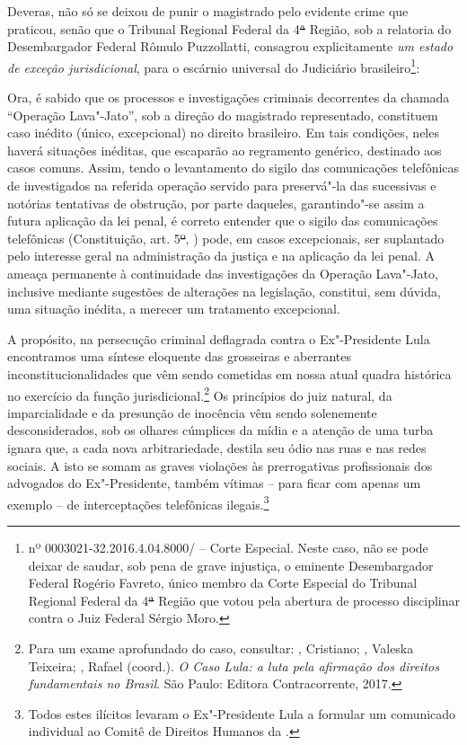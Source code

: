 Deveras, não só se deixou de punir o magistrado pelo evidente crime que
praticou, senão que o Tribunal Regional Federal da 4\sout{ª} Região, sob
a relatoria do Desembargador Federal Rômulo Puzzollatti, consagrou
explicitamente \emph{um estado de exceção jurisdicional}, para o
escárnio universal do Judiciário brasileiro\footnote{ nº
  0003021-32.2016.4.04.8000/ -- Corte Especial. Neste caso, não se
  pode deixar de saudar, sob pena de grave injustiça, o eminente
  Desembargador Federal Rogério Favreto, único membro da Corte Especial
  do Tribunal Regional Federal da 4\sout{ª} Região que votou pela
  abertura de processo disciplinar contra o Juiz Federal Sérgio Moro.}:

Ora, é sabido que os processos e investigações criminais decorrentes da
chamada ``Operação Lava"-Jato'', sob a direção do magistrado
representado, constituem caso inédito (único, excepcional) no direito
brasileiro. Em tais condições, neles haverá situações inéditas, que
escaparão ao regramento genérico, destinado aos casos comuns. Assim,
tendo o levantamento do sigilo das comunicações telefônicas de
investigados na referida operação servido para preservá"-la das
sucessivas e notórias tentativas de obstrução, por parte daqueles,
garantindo"-se assim a futura aplicação da lei penal, é correto entender
que o sigilo das comunicações telefônicas (Constituição, art. 5\sout{º},
) pode, em casos excepcionais, ser suplantado pelo interesse geral na
administração da justiça e na aplicação da lei penal. A ameaça
permanente à continuidade das investigações da Operação Lava"-Jato,
inclusive mediante sugestões de alterações na legislação, constitui, sem
dúvida, uma situação inédita, a merecer um tratamento excepcional.

A propósito, na persecução criminal deflagrada contra o Ex"-Presidente
Lula encontramos uma síntese eloquente das grosseiras e aberrantes
inconstitucionalidades que vêm sendo cometidas em nossa atual quadra
histórica no exercício da função jurisdicional.\footnote{Para um exame
  aprofundado do caso, consultar:  , Cristiano; 
  , Valeska Teixeira; , Rafael (coord.). \emph{O Caso Lula:
  a luta pela afirmação dos direitos fundamentais no Brasil}. São Paulo:
  Editora Contracorrente, 2017.} Os princípios do juiz natural, da
imparcialidade e da presunção de inocência vêm sendo solenemente
desconsiderados, sob os olhares cúmplices da mídia e a atenção de uma
turba ignara que, a cada nova arbitrariedade, destila seu ódio nas ruas
e nas redes sociais. A isto se somam as graves violações às
prerrogativas profissionais dos advogados do Ex"-Presidente, também
vítimas -- para ficar com apenas um exemplo -- de interceptações
telefônicas ilegais.\footnote{Todos estes ilícitos levaram o
  Ex"-Presidente Lula a formular um comunicado individual ao Comitê de
  Direitos Humanos da .}

